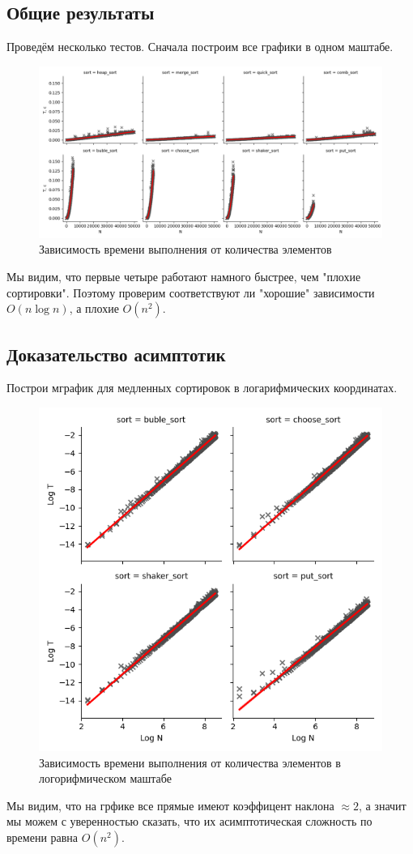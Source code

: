 \documentclass[12pt,a4paper]{article}
\begin{document}
\subsection{Общие результаты}
Проведём несколько тестов. Сначала построим все графики в одном маштабе.
\begin{figure}[!ht]
\includegraphics[width=\textwidth]{imgs/compare_all.png}
\caption{Зависимость времени выполнения от количества элементов}
\end{figure}

Мы видим, что первые четыре работают намного быстрее, чем "плохие сортировки". Поэтому проверим соответствуют ли "хорошие" зависимости $O(n\log n)$, а плохие $O(n^2)$.

\subsection{Доказательство асимптотик}
Построи мграфик для медленных сортировок в логарифмических координатах.
\begin{figure}[!ht]
\includegraphics[width=\textwidth]{imgs/compare_n2.png}
\caption{Зависимость времени выполнения от количества элементов в логорифмическом маштабе}
\end{figure}
Мы видим, что на грфике все прямые имеют коэффицент наклона $\approx2$, а значит мы можем с уверенностью сказать, что их асимптотическая сложность по времени равна $O(n^2)$.
\end{document}
